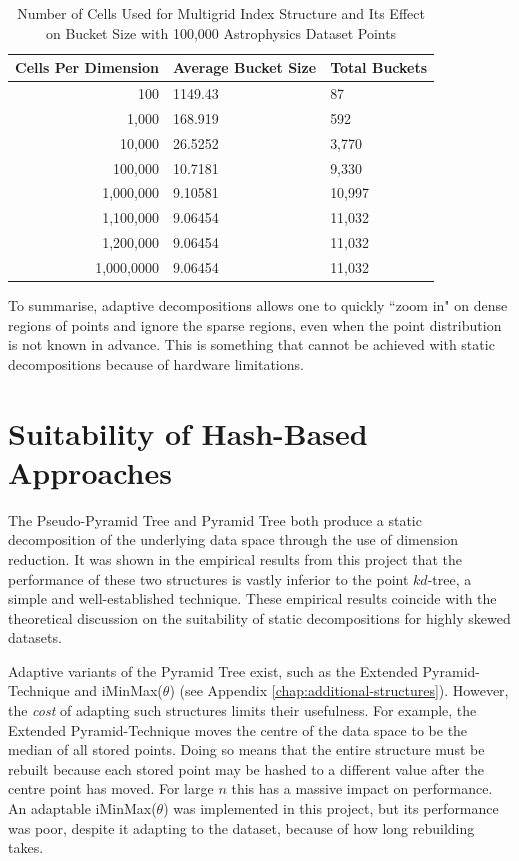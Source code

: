 \begin{table}
	\centering
	\begin{tabular}{|r|l|l|}
	\hline
	\textbf{Cells Per Dimension} & \textbf{Average Bucket Size} & \textbf{Total Buckets} \\
	\hline
	100 & 1149.43 & 87 \\
	1,000 & 168.919 & 592 \\
	10,000 & 26.5252 & 3,770 \\
	100,000 & 10.7181 & 9,330 \\
	1,000,000 & 9.10581 & 10,997 \\
	1,100,000 & 9.06454 & 11,032 \\
	1,200,000 & 9.06454 & 11,032 \\
	1,000,0000 & 9.06454 & 11,032 \\
	\hline
	\end{tabular}
	\caption{Number of Cells Used for Multigrid Index Structure and Its Effect on Bucket Size with 100,000 Astrophysics Dataset Points}
	\label{tab:cell-size-effect}
\end{table}

To summarise, adaptive decompositions allows one to quickly ``zoom in" on dense regions of points and ignore the sparse regions, even when the point distribution is not known in advance. This is something that cannot be achieved with static decompositions because of hardware limitations.

\section{Suitability of Hash-Based Approaches}
	
The Pseudo-Pyramid Tree and Pyramid Tree both produce a static decomposition of the underlying data space through the use of dimension reduction. It was shown in the empirical results from this project that the performance of these two structures is vastly inferior to the point $kd$-tree, a simple and well-established technique. These empirical results coincide with the theoretical discussion on the suitability of static decompositions for highly skewed datasets.

Adaptive variants of the Pyramid Tree exist, such as the Extended Pyramid-Technique \cite{pyramid-tree} and iMinMax($\theta$) (see Appendix \ref{chap:additional-structures}). However, the \textit{cost} of adapting such structures limits their usefulness. For example, the Extended Pyramid-Technique moves the centre of the data space to be the median of all stored points. Doing so means that the entire structure must be rebuilt because each stored point may be hashed to a different value after the centre point has moved. For large $n$ this has a massive impact on performance. An adaptable iMinMax($\theta$) was implemented in this project, but its performance was poor, despite it adapting to the dataset, because of how long rebuilding takes.


